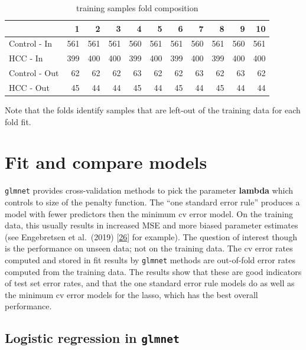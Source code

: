 \documentclass[
]{book}
\begin{document}
\begin{table}

\caption{\label{tab:hcc5hmC-glmnetFit-getTrainFolds}training samples fold composition}
\centering
\begin{tabular}[t]{l|r|r|r|r|r|r|r|r|r|r}
\hline
  & 1 & 2 & 3 & 4 & 5 & 6 & 7 & 8 & 9 & 10\\
\hline
Control - In & 561 & 561 & 561 & 560 & 561 & 561 & 560 & 561 & 560 & 561\\
\hline
HCC - In & 399 & 400 & 400 & 399 & 400 & 399 & 400 & 399 & 400 & 400\\
\hline
Control - Out & 62 & 62 & 62 & 63 & 62 & 62 & 63 & 62 & 63 & 62\\
\hline
HCC - Out & 45 & 44 & 44 & 45 & 44 & 45 & 44 & 45 & 44 & 44\\
\hline
\end{tabular}
\end{table}

Note that the folds identify samples that are left-out of the training
data for each fold fit.

\hypertarget{fit-and-compare-models}{%
\section{Fit and compare models}\label{fit-and-compare-models}}

\texttt{glmnet} provides cross-validation methods to pick the parameter \textbf{lambda} which
controls to size of the penalty function. The ``one standard error rule''
produces a model with fewer predictors then the minimum cv error model.
On the training data, this usually results in increased MSE and more
biased parameter estimates
(see Engebretsen et al.~(2019) {[}\protect\hyperlink{ref-Engebretsen:2019aa}{26}{]} for example).
The question of interest though is the performance on unseen data; not on the training data.
The cv error rates computed and stored in fit results by \texttt{glmnet} methods are
out-of-fold error rates computed from
the training data. The results show that these are good indicators of
test set error rates, and that
the one standard error rule models do as well as the minimum cv error models
for the lasso, which has the best overall performance.

\hypertarget{logistic-regression-in-glmnet}{%
\subsection{\texorpdfstring{Logistic regression in \texttt{glmnet}}{Logistic regression in glmnet}}\label{logistic-regression-in-glmnet}}
\end{document}
